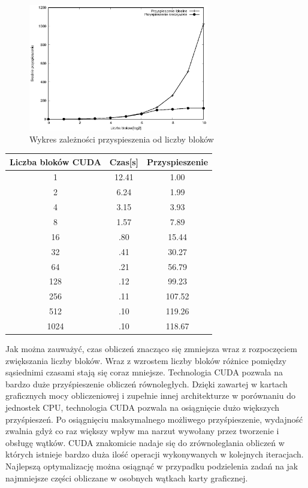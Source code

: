 \documentclass[a4paper,12pt]{article}
\begin{document}
\begin{figure}[!ht]
	\centering
  \includegraphics[width=0.7\textwidth]{cudaWykresPrzyspieszenie.eps}
  \caption{Wykres zależności przyspieszenia od liczby bloków}
\end{figure}

\newpage
\begin{table}[htb]
\centering
\begin{tabular}{|c|c|c|}\hline
Liczba bloków CUDA & Czas[s] & Przyspieszenie\\\hline 
1 & 12.41 & 1.00\\ \hline 
2 & 6.24 & 1.99\\ \hline 
4 & 3.15 & 3.93\\ \hline 
8 & 1.57 & 7.89\\ \hline 
16 & .80 & 15.44\\ \hline 
32 & .41 & 30.27\\ \hline 
64 & .21 & 56.79\\ \hline 
128 & .12 & 99.23\\ \hline
256 & .11 & 107.52\\ \hline 
512 & .10 & 119.26\\ \hline 
1024 & .10 & 118.67\\ \hline 
\end{tabular}
\end{table}
Jak można zauważyć, czas obliczeń znacząco się zmniejsza wraz z rozpoczęciem zwiększania liczby bloków. Wraz z wzrostem liczby bloków różnice pomiędzy sąsiednimi czasami stają się coraz mniejsze. Technologia CUDA pozwala na bardzo duże przyśpieszenie obliczeń równoległych. Dzięki zawartej w kartach graficznych mocy obliczeniowej i zupełnie innej architekturze w porównaniu do jednostek CPU, technologia CUDA pozwala na osiągnięcie dużo większych przyśpieszeń. Po osiągnięciu maksymalnego możliwego przyśpieszenie, wydajność zwalnia gdyż co raz większy wpływ ma narzut wywołany przez tworzenie i obsługę wątków. CUDA znakomicie nadaje się do zrównoleglania obliczeń w których istnieje bardzo duża ilość operacji wykonywanych w kolejnych iteracjach. Najlepszą optymalizację można osiągnąć w przypadku podzielenia zadań na jak najmniejsze części obliczane w osobnych wątkach karty graficznej.
\end{document}
